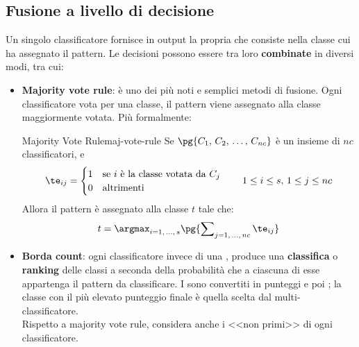 \subsection{Fusione a livello di decisione}\label{sec:fusione_a_livello_di_decisione} %
Un singolo classificatore fornisce in output la propria  che consiste nella classe cui ha assegnato il pattern.
Le decisioni possono essere tra loro \textbf{combinate} in diversi modi, tra cui:
\begin{itemize}
    \item \textbf{Majority vote rule}: è uno dei più noti e semplici metodi di fusione.
        Ogni classificatore vota per una classe, il pattern viene assegnato alla classe maggiormente votata.
        Più formalmente:
        \begin{theorem}{Majority Vote Rule}{maj-vote-rule}
            Se $\pg{C_1,\,C_2,\,\dots,\,C_{nc}}$ è un insieme di $nc$ classificatori, e
            \[
                \te_{ij} = \begin{cases}
                    1 & \text{se $i$ è la classe votata da $C_j$} \\
                    0 & \text{altrimenti}
                \end{cases}
                \qquad 1 \le i \le s,\, 1 \le j \le nc
            \]
            Allora il pattern è assegnato alla classe $t$ tale che:
            \[
                t = \argmax_{i=1,\,\dots,\,s}{\pg{\sum\nolimits_{j=1,\,\dots,\,nc}{\te_{ij}}}}
            \]
        \end{theorem}
    \item \textbf{Borda count}: ogni classificatore invece di una , produce una \textbf{classifica} o \textbf{ranking} delle classi a seconda della probabilità che a ciascuna di esse appartenga il pattern da classificare.
        \emptyln{}
        I  sono convertiti in punteggi e poi ; la classe con il più elevato punteggio finale è quella scelta dal multi-classificatore.
        \\
        Rispetto a majority vote rule, considera anche i <<non primi>> di ogni classificatore.
\end{itemize}
%
